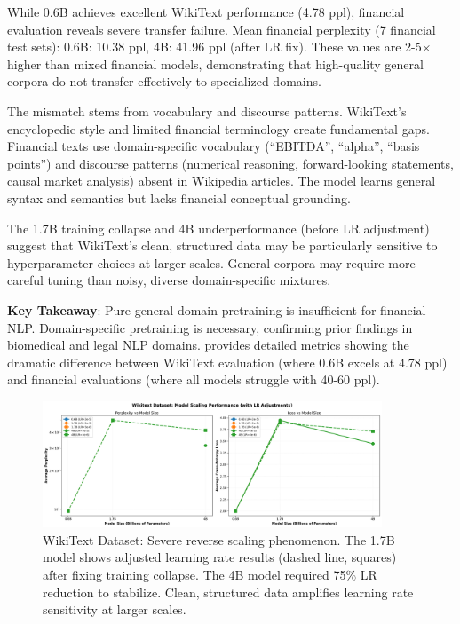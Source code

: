 While 0.6B achieves excellent WikiText performance (4.78 ppl), financial evaluation reveals severe transfer failure. Mean financial perplexity (7 financial test sets): 0.6B: 10.38 ppl, 4B: 41.96 ppl (after LR fix). These values are 2-5$\times$ higher than mixed financial models, demonstrating that high-quality general corpora do not transfer effectively to specialized domains.

The mismatch stems from vocabulary and discourse patterns. WikiText's encyclopedic style and limited financial terminology create fundamental gaps. Financial texts use domain-specific vocabulary (``EBITDA'', ``alpha'', ``basis points'') and discourse patterns (numerical reasoning, forward-looking statements, causal market analysis) absent in Wikipedia articles. The model learns general syntax and semantics but lacks financial conceptual grounding.

The 1.7B training collapse and 4B underperformance (before LR adjustment) suggest that WikiText's clean, structured data may be particularly sensitive to hyperparameter choices at larger scales. General corpora may require more careful tuning than noisy, diverse domain-specific mixtures.

\textbf{Key Takeaway}: Pure general-domain pretraining is insufficient for financial NLP. Domain-specific pretraining is necessary, confirming prior findings in biomedical and legal NLP domains.  provides detailed metrics showing the dramatic difference between WikiText evaluation (where 0.6B excels at 4.78 ppl) and financial evaluations (where all models struggle with 40-60 ppl).

\begin{figure}[h]
\centering
\includegraphics[width=0.9\textwidth]{figures/scaling_wikitext.png}
\caption[WikiText Dataset: Reverse Scaling]{WikiText Dataset: Severe reverse scaling phenomenon. The 1.7B model shows adjusted learning rate results (dashed line, squares) after fixing training collapse. The 4B model required 75\% LR reduction to stabilize. Clean, structured data amplifies learning rate sensitivity at larger scales.}
\label{fig:scaling_wikitext}
\end{figure}

